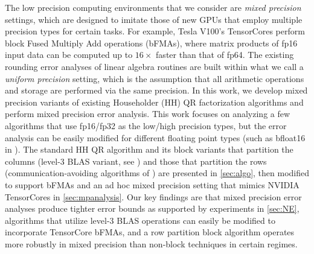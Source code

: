 \documentclass[review,onefignum,onetabnum]{siamart190516}
\begin{document}
The low precision computing environments that we consider are \emph{mixed precision} settings, which are designed to imitate those of new GPUs that employ multiple precision types for certain tasks. 
For example, Tesla V100's TensorCores perform block Fused Multiply Add operations (bFMAs), where matrix products of fp16 input data can be computed up to $16\times$ faster than that of fp64.
The existing rounding error analyses of linear algebra routines are built within what we call a \emph{uniform precision} setting, which is the assumption that all arithmetic operations and storage are performed via the same precision.
In this work, we develop mixed precision variants of existing Householder (HH) QR factorization algorithms and perform mixed precision error analysis.
This work focuses on analyzing a few algorithms that use fp16/fp32 as the low/high precision types, but the error analysis can be easily modified for different floating point types (such as bfloat16 in \cite{tagliavini2018floating}).
The standard HH QR algorithm and its block variants that partition the columns (level-3 BLAS variant, see \cite{golub2013matrix,Higham2002}) and those that partition the rows (communication-avoiding algorithms of \cite{Demmel2012}) are presented in \cref{sec:algo}, then modified to support bFMAs and an ad hoc mixed precision setting that mimics NVIDIA TensorCores in \cref{sec:mpanalysis}.
Our key findings are that mixed precision error analyses produce tighter error bounds as supported by experiments in \cref{sec:NE}, algorithms that utilize level-3 BLAS operations can easily be modified to incorporate TensorCore bFMAs, and a row partition block algorithm operates  more robustly in mixed precision than non-block techniques in certain regimes.
\end{document}

